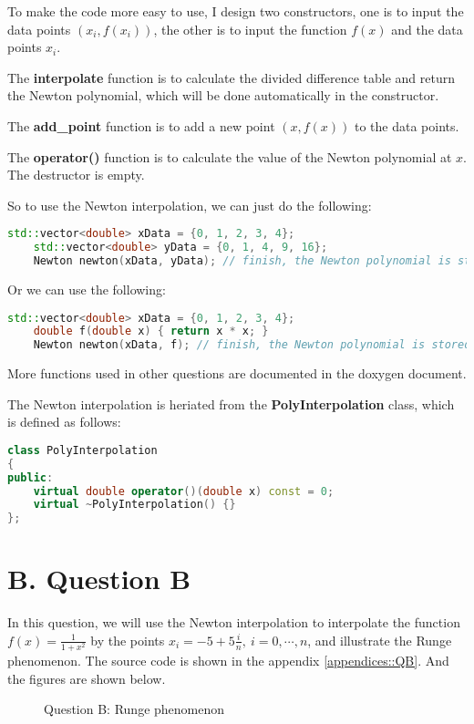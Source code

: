 \documentclass[a4paper]{article}
\begin{document}
To make the code more easy to use, I design two constructors, one is to input the data points $(x_i, f(x_i))$, the other is to input the function $f(x)$ and the data points $x_i$. 

The \textbf{interpolate} function is to calculate the divided difference table and return the Newton polynomial, which will be done automatically in the constructor. 

The \textbf{add\_point} function is to add a new point $(x, f(x))$ to the data points. 

The \textbf{operator()} function is to calculate the value of the Newton polynomial at $x$. The destructor is empty.

So to use the Newton interpolation, we can just do the following:
\begin{lstlisting}[language=C++]
	std::vector<double> xData = {0, 1, 2, 3, 4};
	std::vector<double> yData = {0, 1, 4, 9, 16};
	Newton newton(xData, yData); // finish, the Newton polynomial is stored in newton.m_poly
\end{lstlisting}
Or we can use the following:
\begin{lstlisting}[language=C++]
	std::vector<double> xData = {0, 1, 2, 3, 4};
	double f(double x) { return x * x; }
	Newton newton(xData, f); // finish, the Newton polynomial is stored in newton.m_poly
\end{lstlisting}

More functions used in other questions are documented in the doxygen document. 

The Newton interpolation is heriated from the \textbf{PolyInterpolation} class, which is defined as follows:
\begin{lstlisting}[language=C++]
class PolyInterpolation
{
public:
	virtual double operator()(double x) const = 0;
	virtual ~PolyInterpolation() {}
};
\end{lstlisting}


\section*{B. Question B}

In this question, we will use the Newton interpolation to interpolate the function $f(x) = \frac{1}{1+x^2}$ by the points $x_i = -5 + 5\frac{i}{n},~ i=0,\cdots,n$, and illustrate the Runge phenomenon. The source code is shown in the appendix \ref{appendices::QB}. And the figures are shown below.
\begin{figure}[ht]
    \centering
    \caption{Question B: Runge phenomenon}
    \label{fig::questionB}
\end{figure}
\end{document}
